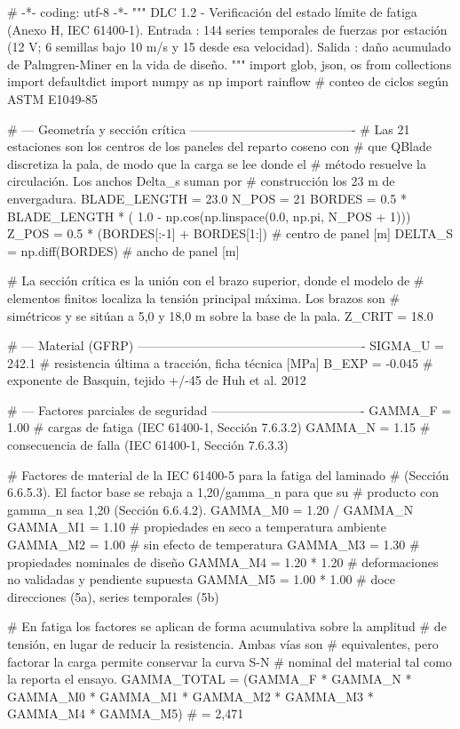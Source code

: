 \begin{pycode}
# -*- coding: utf-8 -*-
"""
DLC 1.2 - Verificación del estado límite de fatiga (Anexo H, IEC 61400-1).
Entrada : 144 series temporales de fuerzas por estación (12 V; 6 semillas
          bajo 10 m/s y 15 desde esa velocidad).
Salida  : daño acumulado de Palmgren-Miner en la vida de diseño.
"""
import glob, json, os
from collections import defaultdict
import numpy as np
import rainflow          # conteo de ciclos según ASTM E1049-85

# --- Geometría y sección crítica ----------------------------------------
# Las 21 estaciones son los centros de los paneles del reparto coseno con
# que QBlade discretiza la pala, de modo que la carga se lee donde el
# método resuelve la circulación. Los anchos Delta_s suman por
# construcción los 23 m de envergadura.
BLADE_LENGTH = 23.0
N_POS        = 21
BORDES       = 0.5 * BLADE_LENGTH * (
    1.0 - np.cos(np.linspace(0.0, np.pi, N_POS + 1)))
Z_POS        = 0.5 * (BORDES[:-1] + BORDES[1:])   # centro de panel [m]
DELTA_S      = np.diff(BORDES)                    # ancho de panel [m]

# La sección crítica es la unión con el brazo superior, donde el modelo de
# elementos finitos localiza la tensión principal máxima. Los brazos son
# simétricos y se sitúan a 5,0 y 18,0 m sobre la base de la pala.
Z_CRIT = 18.0

# --- Material (GFRP) -------------------------------------------------------
SIGMA_U = 242.1      # resistencia última a tracción, ficha técnica [MPa]
B_EXP   = -0.045     # exponente de Basquin, tejido +/-45 de Huh et al. 2012

# --- Factores parciales de seguridad -------------------------------------
GAMMA_F = 1.00       # cargas de fatiga (IEC 61400-1, Sección 7.6.3.2)
GAMMA_N = 1.15       # consecuencia de falla (IEC 61400-1, Sección 7.6.3.3)

# Factores de material de la IEC 61400-5 para la fatiga del laminado
# (Sección 6.6.5.3). El factor base se rebaja a 1,20/gamma_n para que su
# producto con gamma_n sea 1,20 (Sección 6.6.4.2).
GAMMA_M0 = 1.20 / GAMMA_N
GAMMA_M1 = 1.10      # propiedades en seco a temperatura ambiente
GAMMA_M2 = 1.00      # sin efecto de temperatura
GAMMA_M3 = 1.30      # propiedades nominales de diseño
GAMMA_M4 = 1.20 * 1.20   # deformaciones no validadas y pendiente supuesta
GAMMA_M5 = 1.00 * 1.00   # doce direcciones (5a), series temporales (5b)

# En fatiga los factores se aplican de forma acumulativa sobre la amplitud
# de tensión, en lugar de reducir la resistencia. Ambas vías son
# equivalentes, pero factorar la carga permite conservar la curva S-N
# nominal del material tal como la reporta el ensayo.
GAMMA_TOTAL = (GAMMA_F * GAMMA_N * GAMMA_M0 * GAMMA_M1 * GAMMA_M2
               * GAMMA_M3 * GAMMA_M4 * GAMMA_M5)    # = 2,471


\end{pycode}
